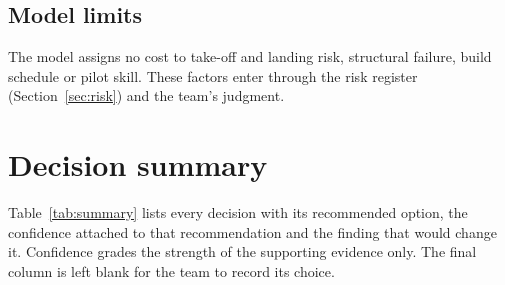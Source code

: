 \documentclass[final]{dbfdoc}
\begin{document}
\subsection{Model limits}
The model assigns no cost to take-off and landing risk, structural failure, build schedule or pilot skill. These factors enter through the risk register (Section~\ref{sec:risk}) and the team's judgment.

\section{Decision summary}
Table~\ref{tab:summary} lists every decision with its recommended option, the confidence attached to that recommendation and the finding that would change it. Confidence grades the strength of the supporting evidence only. The final column is left blank for the team to record its choice.
\end{document}

